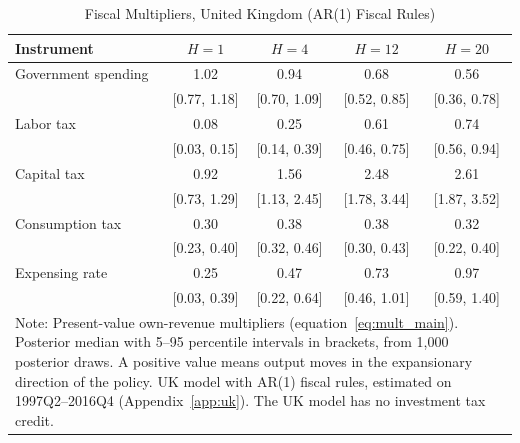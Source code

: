 \begin{table}[ht]
\centering
\caption{Fiscal Multipliers, United Kingdom (AR(1) Fiscal Rules)}
\label{tab:mult_uk}
\begin{tabular}{lcccc}
\hline\hline
Instrument & $H=1$ & $H=4$ & $H=12$ & $H=20$ \\
\hline
Government spending      & 1.02 & 0.94 & 0.68 & 0.56 \\
                         & [0.77, 1.18] & [0.70, 1.09] & [0.52, 0.85] & [0.36, 0.78] \\
Labor tax                & 0.08 & 0.25 & 0.61 & 0.74 \\
                         & [0.03, 0.15] & [0.14, 0.39] & [0.46, 0.75] & [0.56, 0.94] \\
Capital tax              & 0.92 & 1.56 & 2.48 & 2.61 \\
                         & [0.73, 1.29] & [1.13, 2.45] & [1.78, 3.44] & [1.87, 3.52] \\
Consumption tax          & 0.30 & 0.38 & 0.38 & 0.32 \\
                         & [0.23, 0.40] & [0.32, 0.46] & [0.30, 0.43] & [0.22, 0.40] \\
Expensing rate           & 0.25 & 0.47 & 0.73 & 0.97 \\
                         & [0.03, 0.39] & [0.22, 0.64] & [0.46, 1.01] & [0.59, 1.40] \\
\hline\hline
\multicolumn{5}{p{0.85\textwidth}}{\footnotesize Note: Present-value own-revenue multipliers (equation~\ref{eq:mult_main}). Posterior median with 5--95 percentile intervals in brackets, from 1{,}000 posterior draws. A positive value means output moves in the expansionary direction of the policy. UK model with AR(1) fiscal rules, estimated on 1997Q2--2016Q4 (Appendix~\ref{app:uk}). The UK model has no investment tax credit.}
\end{tabular}
\end{table}
